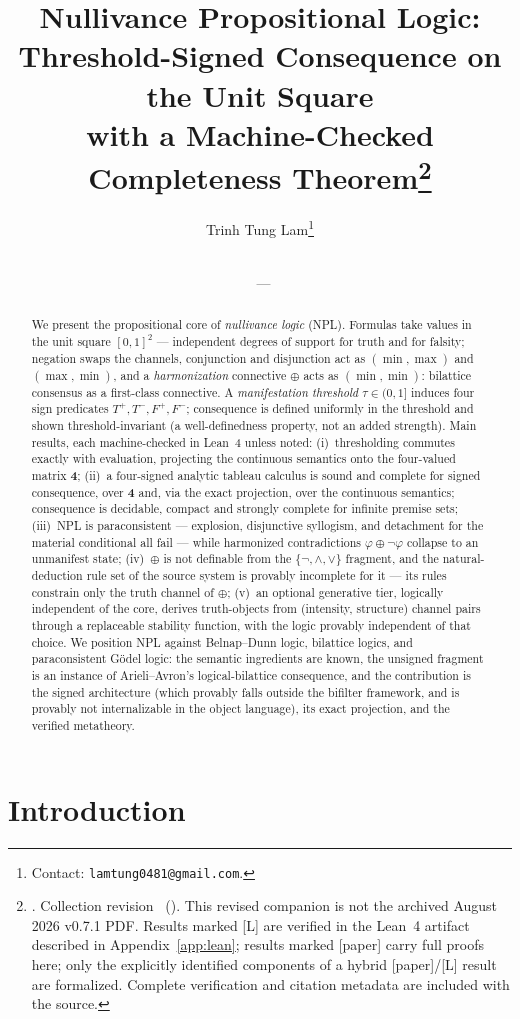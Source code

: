 \documentclass[11pt,a4paper]{article}
\title{Nullivance Propositional Logic:\\
Threshold-Signed Consequence on the Unit Square\\
with a Machine-Checked Completeness Theorem\thanks{%
\PublicationPart. Collection revision \PublicationVersion\ (\PublicationDate).
This revised companion is not the archived August 2026 v0.7.1 PDF.
Results marked [L] are verified in the Lean~4 artifact
described in Appendix~\ref{app:lean}; results marked [paper] carry full proofs
here; only the explicitly identified components of a hybrid [paper]/[L] result
are formalized. Complete verification and citation metadata are
included with the source.}}
\author{Trinh Tung Lam\thanks{Contact: \texttt{lamtung0481@gmail.com}.}}
\date{\PublicationDate\\\small \PublicationPart\ --- \PublicationVersion}
\theoremstyle{definition}
\newcommand{\FOUR}{\mathbf{4}}
\newcommand{\hmz}{\oplus}                       %
\newcommand{\Tp}{T^{+}}\newcommand{\Tm}{T^{-}}
\newcommand{\Fp}{F^{+}}\newcommand{\Fm}{F^{-}}
\begin{document}
\maketitle

\begin{abstract}
We present the propositional core of \emph{nullivance logic} (NPL). Formulas
take values in the unit square $[0,1]^2$ --- independent degrees of support
for truth and for falsity; negation swaps the channels, conjunction and
disjunction act as $(\min,\max)$ and $(\max,\min)$, and a
\emph{harmonization} connective $\hmz$ acts as $(\min,\min)$: bilattice
consensus as a first-class connective. A \emph{manifestation threshold}
$\tau\in(0,1]$ induces four sign predicates $\Tp,\Tm,\Fp,\Fm$; consequence
is defined uniformly in the threshold and shown threshold-invariant (a
well-definedness property, not an added strength). Main results, each machine-checked in Lean~4 unless noted:
(i)~thresholding commutes exactly with evaluation, projecting the continuous
semantics onto the four-valued matrix $\FOUR$; (ii)~a four-signed analytic
tableau calculus is sound and complete for signed consequence, over $\FOUR$
and, via the exact projection, over the continuous semantics; consequence is
decidable, compact and strongly complete for infinite
premise sets; (iii)~NPL is paraconsistent --- explosion, disjunctive
syllogism, and detachment for the material conditional all fail --- while
harmonized contradictions $\varphi\hmz\lnot\varphi$ collapse to an unmanifest
state; (iv)~$\hmz$ is not definable from the $\{\lnot,\wedge,\vee\}$ fragment,
and the natural-deduction rule set of the source system is provably
incomplete for it --- its rules constrain only the truth channel of $\hmz$;
(v)~an optional generative tier, logically independent of the core, derives truth-objects from
(intensity, structure) channel pairs through a replaceable stability
function, with the logic provably independent of that choice. We position
NPL against Belnap--Dunn logic, bilattice logics, and paraconsistent
G\"odel logic: the semantic ingredients are known, the unsigned fragment is
an instance of Arieli--Avron's logical-bilattice consequence, and the
contribution is the signed architecture (which provably falls outside the
bifilter framework, and is provably not internalizable in the object
language), its exact projection, and the verified metatheory.
\end{abstract}

\section{Introduction}\label{sec:intro}
\end{document}
